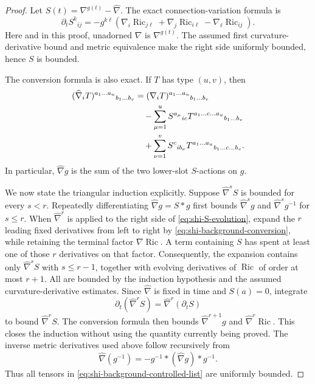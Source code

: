 \documentclass[10pt]{coll-l}
\theoremstyle{definition}
\theoremstyle{remark}
\numberwithin{section}{chapter}
\numberwithin{equation}{chapter}
\newcommand{\Ric}{\operatorname{Ric}}
\begin{document}
\begin{proof}
Let $S(t)=\nabla^{g(t)}-\widehat\nabla$.  The exact connection-variation
formula is
\begin{equation}
 \partial_tS^k{}_{ij}
   =-g^{k\ell}
      \left(
       \nabla_i\Ric_{j\ell}+\nabla_j\Ric_{i\ell}
                         -\nabla_\ell\Ric_{ij}
      \right).                                           \label{eq:shi-S-evolution}
\end{equation}
Here and in this proof, unadorned $\nabla$ is $\nabla^{g(t)}$.  The assumed
first curvature-derivative bound and metric equivalence make the right side
uniformly bounded, hence $S$ is bounded.

The conversion formula is also exact.  If $T$ has type $(u,v)$, then
\begin{align}
 (\widehat\nabla_iT)^{a_1\ldots a_u}{}_{b_1\ldots b_v}
 &= (\nabla_iT)^{a_1\ldots a_u}{}_{b_1\ldots b_v}\notag\\
 &\quad-
   \sum_{\mu=1}^u S^{a_\mu}{}_{ic}
    T^{a_1\ldots c\ldots a_u}{}_{b_1\ldots b_v}\notag\\
 &\quad+
   \sum_{\nu=1}^v S^c{}_{ib_\nu}
    T^{a_1\ldots a_u}{}_{b_1\ldots c\ldots b_v}.        \label{eq:shi-background-conversion}
\end{align}
In particular, $\widehat\nabla g$ is the sum of the two lower-slot
$S$-actions on $g$.

We now state the triangular induction explicitly.  Suppose
$\widehat\nabla^sS$ is bounded for every $s<r$.  Repeatedly differentiating
$\widehat\nabla g=S*g$ first bounds $\widehat\nabla^s g$ and
$\widehat\nabla^s g^{-1}$ for $s\leq r$.  When
$\widehat\nabla^r$ is applied to the right side of
\eqref{eq:shi-S-evolution}, expand the $r$ leading fixed derivatives from
left to right by \eqref{eq:shi-background-conversion}, while retaining the
terminal factor $\nabla\Ric$.  A term containing $S$ has spent at least one
of those $r$ derivatives on that factor.  Consequently, the expansion
contains only $\widehat\nabla^sS$ with $s\leq r-1$, together with evolving
derivatives of $\Ric$ of order at most $r+1$.  All are bounded by the
induction hypothesis and the assumed curvature-derivative estimates.  Since
$\widehat\nabla$ is fixed in time and $S(a)=0$, integrate
\[
       \partial_t(\widehat\nabla^rS)
          =\widehat\nabla^r(\partial_tS)
\]
to bound $\widehat\nabla^rS$.  The conversion formula then bounds
$\widehat\nabla^{r+1}g$ and $\widehat\nabla^r\Ric$.  This closes the
induction without using the quantity currently being proved.  The inverse
metric derivatives used above follow recursively from
\[
       \widehat\nabla(g^{-1})=-g^{-1}*(\widehat\nabla g)*g^{-1}.
\]
Thus all tensors in
\eqref{eq:shi-background-controlled-list} are uniformly bounded.


\end{proof}
\end{document}
